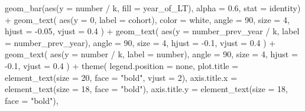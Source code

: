 \documentclass[
]{book}
\newenvironment{Shaded}{\begin{snugshade}}{\end{snugshade}}
\newcommand{\AttributeTok}[1]{\textcolor[rgb]{0.77,0.63,0.00}{#1}}
\newcommand{\DecValTok}[1]{\textcolor[rgb]{0.00,0.00,0.81}{#1}}
\newcommand{\FloatTok}[1]{\textcolor[rgb]{0.00,0.00,0.81}{#1}}
\newcommand{\FunctionTok}[1]{\textcolor[rgb]{0.00,0.00,0.00}{#1}}
\newcommand{\NormalTok}[1]{#1}
\newcommand{\SpecialCharTok}[1]{\textcolor[rgb]{0.00,0.00,0.00}{#1}}
\newcommand{\StringTok}[1]{\textcolor[rgb]{0.31,0.60,0.02}{#1}}
\begin{document}
\begin{Shaded}
\begin{Highlighting}[]
    \FunctionTok{geom\_bar}\NormalTok{(}\FunctionTok{aes}\NormalTok{(}\AttributeTok{y =}\NormalTok{ number }\SpecialCharTok{/}\NormalTok{ k, }\AttributeTok{fill =}\NormalTok{ year\_of\_LT),}
             \AttributeTok{alpha =} \FloatTok{0.6}\NormalTok{,}
             \AttributeTok{stat =} \StringTok{\textquotesingle{}identity\textquotesingle{}}\NormalTok{) }\SpecialCharTok{+}
    \FunctionTok{geom\_text}\NormalTok{(}
        \FunctionTok{aes}\NormalTok{(}\AttributeTok{y =} \DecValTok{0}\NormalTok{, }\AttributeTok{label =}\NormalTok{ cohort),}
        \AttributeTok{color =} \StringTok{\textquotesingle{}white\textquotesingle{}}\NormalTok{,}
        \AttributeTok{angle =} \DecValTok{90}\NormalTok{,}
        \AttributeTok{size =} \DecValTok{4}\NormalTok{,}
        \AttributeTok{hjust =} \SpecialCharTok{{-}}\FloatTok{0.05}\NormalTok{,}
        \AttributeTok{vjust =} \FloatTok{0.4}
\NormalTok{    ) }\SpecialCharTok{+}
    \FunctionTok{geom\_text}\NormalTok{(}
        \FunctionTok{aes}\NormalTok{(}\AttributeTok{y =}\NormalTok{ number\_prev\_year }\SpecialCharTok{/}\NormalTok{ k, }\AttributeTok{label =}\NormalTok{ number\_prev\_year),}
        \AttributeTok{angle =} \DecValTok{90}\NormalTok{,}
        \AttributeTok{size =} \DecValTok{4}\NormalTok{,}
        \AttributeTok{hjust =} \SpecialCharTok{{-}}\FloatTok{0.1}\NormalTok{,}
        \AttributeTok{vjust =} \FloatTok{0.4}
\NormalTok{    ) }\SpecialCharTok{+}
    \FunctionTok{geom\_text}\NormalTok{(}
        \FunctionTok{aes}\NormalTok{(}\AttributeTok{y =}\NormalTok{ number }\SpecialCharTok{/}\NormalTok{ k, }\AttributeTok{label =}\NormalTok{ number),}
        \AttributeTok{angle =} \DecValTok{90}\NormalTok{,}
        \AttributeTok{size =} \DecValTok{4}\NormalTok{,}
        \AttributeTok{hjust =} \SpecialCharTok{{-}}\FloatTok{0.1}\NormalTok{,}
        \AttributeTok{vjust =} \FloatTok{0.4}
\NormalTok{    ) }\SpecialCharTok{+}
    \FunctionTok{theme}\NormalTok{(}
        \AttributeTok{legend.position =} \StringTok{\textquotesingle{}none\textquotesingle{}}\NormalTok{,}
        \AttributeTok{plot.title =} \FunctionTok{element\_text}\NormalTok{(}\AttributeTok{size =} \DecValTok{20}\NormalTok{, }\AttributeTok{face =} \StringTok{"bold"}\NormalTok{, }\AttributeTok{vjust =} \DecValTok{2}\NormalTok{),}
        \AttributeTok{axis.title.x =} \FunctionTok{element\_text}\NormalTok{(}\AttributeTok{size =} \DecValTok{18}\NormalTok{, }\AttributeTok{face =} \StringTok{"bold"}\NormalTok{),}
        \AttributeTok{axis.title.y =} \FunctionTok{element\_text}\NormalTok{(}\AttributeTok{size =} \DecValTok{18}\NormalTok{, }\AttributeTok{face =} \StringTok{"bold"}\NormalTok{),}

\end{Highlighting}
\end{Shaded}
\end{document}
